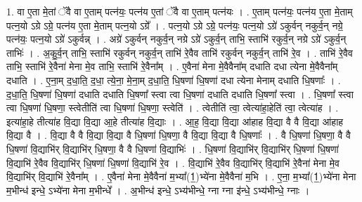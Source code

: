 \documentclass[17pt]{extarticle}
\begin{document}
1. वा ए॒ता मे॒तां ॅवै वा ए॒ताम् पत्न॑यः॒ पत्न॑य ए॒तां ॅवै वा ए॒ताम् पत्न॑यः । . ए॒ताम् पत्न॑यः॒ पत्न॑य ए॒ता मे॒ताम् पत्न॒यो ऽग्रे ऽग्रे॒ पत्न॑य ए॒ता मे॒ताम् पत्न॒यो ऽग्रे᳚ । . पत्न॒यो ऽग्रे ऽग्रे॒ पत्न॑यः॒ पत्न॒यो ऽग्रे॑ ऽकुर्वन् नकुर्व॒न् नग्रे॒ पत्न॑यः॒ पत्न॒यो ऽग्रे॑ ऽकुर्वन्न् । . अग्रे॑ ऽकुर्वन् नकुर्व॒न् नग्रे ऽग्रे॑ ऽकुर्व॒न् ताभि॒ स्ताभि॑ रकुर्व॒न् नग्रे ऽग्रे॑ ऽकुर्व॒न् ताभिः॑ । . अ॒कु॒र्व॒न् ताभि॒ स्ताभि॑ रकुर्वन् नकुर्व॒न् ताभि॑ रे॒वैव ताभि॑ रकुर्वन् नकुर्व॒न् ताभि॑ रे॒व । . ताभि॑ रे॒वैव ताभि॒ स्ताभि॑ रे॒वैना॑ मेना मे॒व ताभि॒ स्ताभि॑ रे॒वैना᳚म् । . ए॒वैना॑ मेना मे॒वैवैना᳚म् दधाति दधा त्येना मे॒वैवैना᳚म् दधाति । . ए॒ना॒म् द॒धा॒ति॒ द॒धा॒ त्ये॒ना॒ मे॒ना॒म् द॒धा॒ति॒ धि॒षणा॑ धि॒षणा॑ दधा त्येना मेनाम् दधाति धि॒षणाः᳚ । . द॒धा॒ति॒ धि॒षणा॑ धि॒षणा॑ दधाति दधाति धि॒षणा᳚ स्त्वा त्वा धि॒षणा॑ दधाति दधाति धि॒षणा᳚ स्त्वा । . धि॒षणा᳚ स्त्वा त्वा धि॒षणा॑ धि॒षणा॒ स्त्वेतीति॑ त्वा धि॒षणा॑ धि॒षणा॒ स्त्वेति॑ । . त्वेतीति॑ त्वा॒ त्वेत्या॑हा॒हेति॑ त्वा॒ त्वेत्या॑ह । . इत्या॑हा॒हे तीत्या॑ह वि॒द्या वि॒द्या आ॒हे तीत्या॑ह वि॒द्याः । . आ॒ह॒ वि॒द्या वि॒द्या आ॑हाह वि॒द्या वै वै वि॒द्या आ॑हाह वि॒द्या वै । . वि॒द्या वै वै वि॒द्या वि॒द्या वै धि॒षणा॑ धि॒षणा॒ वै वि॒द्या वि॒द्या वै धि॒षणाः᳚ । . वै धि॒षणा॑ धि॒षणा॒ वै वै धि॒षणा॑ वि॒द्याभि॑र् वि॒द्याभि॑र् धि॒षणा॒ वै वै धि॒षणा॑ वि॒द्याभिः॑ । . धि॒षणा॑ वि॒द्याभि॑र् वि॒द्याभि॑र् धि॒षणा॑ धि॒षणा॑ वि॒द्याभि॑ रे॒वैव वि॒द्याभि॑र् धि॒षणा॑ धि॒षणा॑ वि॒द्याभि॑ रे॒व । . वि॒द्याभि॑ रे॒वैव वि॒द्याभि॑र् वि॒द्याभि॑ रे॒वैना॑ मेना मे॒व वि॒द्याभि॑र् वि॒द्याभि॑ रे॒वैना᳚म् । . ए॒वैना॑ मेना मे॒वैवैना॑ म॒भ्या᳚(1॒)भ्ये॑ना मे॒वैवैना॑ म॒भि । . ए॒ना॒ म॒भ्या᳚(1॒)भ्ये॑ना मेना म॒भीन्ध॑ इन्धे॒ ऽभ्ये॑ना मेना म॒भीन्धे᳚ । . अ॒भीन्ध॑ इन्धे॒ ऽभ्य॑भीन्धे॒ ग्ना ग्ना इ॑न्धे॒ ऽभ्य॑भीन्धे॒ ग्नाः । \newline
\end{document}
